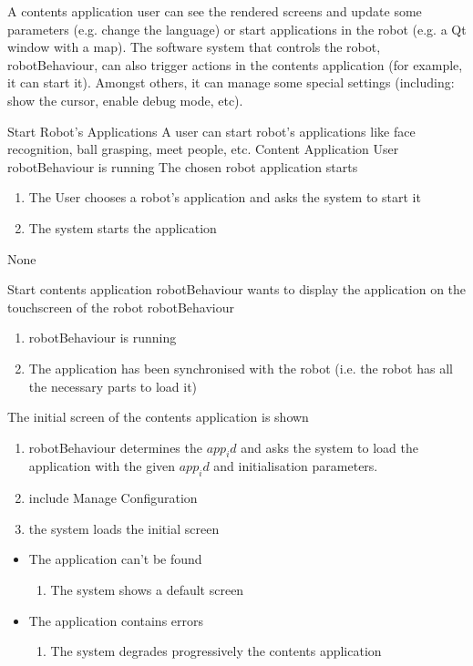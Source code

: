 A contents application user can see the rendered screens and update some parameters (e.g. change the language) or start applications in the robot (e.g. a Qt window with a map).
The software system that controls the robot, robotBehaviour, can also trigger actions in the contents application (for example, it can start it).
Amongst others, it can manage some special settings (including: show the cursor, enable debug mode, etc). 

\begin{suc}
{Start Robot's Applications}
{A user can start robot's applications like face recognition, ball grasping, meet people, etc.}
{Content Application User}
{robotBehaviour is running}
{The chosen robot application starts}
{
    \begin{enumerate}
        \item The User chooses a robot's application and asks the system to start it
        \item The system starts the application
    \end{enumerate}
}
{None}
\end{suc}

\begin{suc}
{Start contents application}
{robotBehaviour wants to display the application on the touchscreen of the robot}
{robotBehaviour}
{
	\begin{enumerate}
        \item robotBehaviour is running
        \item The application has been synchronised with the robot (i.e. the robot has all the necessary parts to load it)
    \end{enumerate}
}
{
The initial screen of the contents application is shown
}
{
    \begin{enumerate}
        \item robotBehaviour determines the $app_id$ and asks the system to load the application with the given $app_id$ and initialisation parameters.
        \item include Manage Configuration
		\item the system loads the initial screen
    \end{enumerate}
}
{    
	\begin{itemize}
        \item The application can't be found
        \begin{enumerate}
        	\item The system shows a default screen
    	\end{enumerate}
    	\item The application contains errors
        \begin{enumerate}
        	\item The system degrades progressively the contents application
    	\end{enumerate}
    \end{itemize}    
}
\end{suc}


